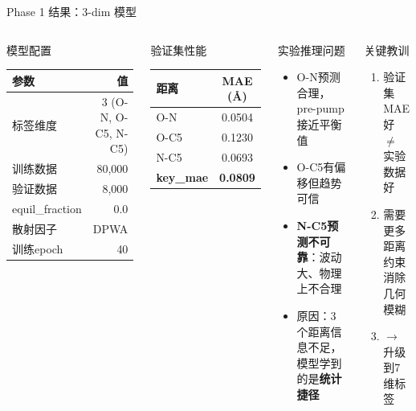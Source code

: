 \documentclass[aspectratio=169,9pt]{beamer}
\begin{document}
\begin{frame}{Phase 1 结果：3-dim 模型}
  \begin{columns}[T]
    \begin{block}{模型配置}
      \scriptsize
      \begin{tabular}{@{}lr@{}}
        \toprule
        参数 & 值 \\
        \midrule
        标签维度 & 3 (O-N, O-C5, N-C5) \\
        训练数据 & 80,000 \\
        验证数据 & 8,000 \\
        equil\_fraction & 0.0 \\
        散射因子 & DPWA \\
        训练epoch & 40 \\
        \bottomrule
      \end{tabular}
    \end{block}

    \begin{exampleblock}{验证集性能}
      \scriptsize
      \begin{tabular}{@{}lc@{}}
        \toprule
        距离 & MAE (\AA) \\
        \midrule
        O-N & 0.0504 \\
        O-C5 & 0.1230 \\
        N-C5 & 0.0693 \\
        \midrule
        \textbf{key\_mae} & \textbf{0.0809} \\
        \bottomrule
      \end{tabular}
    \end{exampleblock}

    \begin{alertblock}{实验推理问题}
      \scriptsize
      \begin{itemize}
        \item O-N预测合理，pre-pump接近平衡值
        \item O-C5有偏移但趋势可信
        \item \textbf{N-C5预测不可靠}：波动大、物理上不合理
        \item 原因：3个距离信息不足，模型学到的是\textbf{统计捷径}
      \end{itemize}
    \end{alertblock}

    \begin{block}{关键教训}
      \scriptsize
      \begin{enumerate}
        \item 验证集MAE好 $\neq$ 实验数据好
        \item 需要更多距离约束消除几何模糊
        \item $\to$ 升级到7维标签
      \end{enumerate}
    \end{block}
  \end{columns}
\end{frame}
\end{document}
